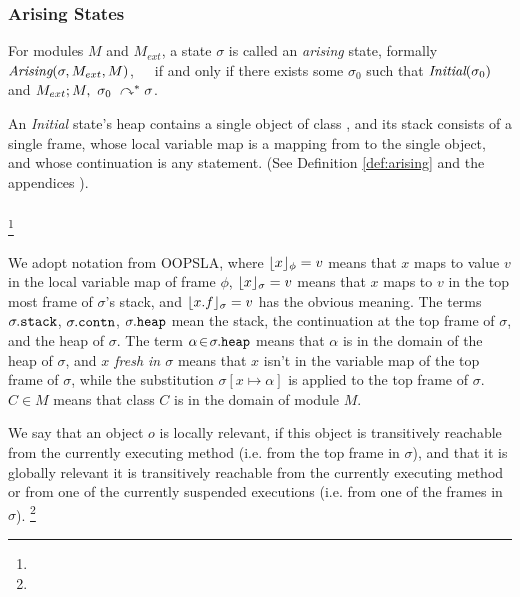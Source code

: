\subsubsection{Arising States}

\begin{definition}
\label{def:arising}
For   modules $M$ and  $M_{ext}$, a %
 state $\sigma$ is 
called an \emph{arising} state, formally \ \ \ $\textit{Arising}(\sigma, M_{ext}, M)$,\ \ \ 
if and only if there exists some $\sigma_0$ such that $\textit{Initial}(\sigma_0)$ and
$M_{ext} ; M,\ \sigma_0\ \curvearrowright^* \sigma$.
\end{definition}

An \emph{Initial} state's heap contains a single object of class , and
its  stack   consists of a single frame, whose local variable map is a
mapping from \prg{this} to the single object, and whose continuation is  any statement.
(See Definition %
\ref{def:arising} and the 
{appendices %
\cite{necessityFull}).}

\subsubsection{}

\footnote{}


We adopt notation from OOPSLA, where
 $\lfloor x \rfloor_{\phi} = v$  means that $x$ maps to
value $v$ in the local variable map of frame $\phi$, $\lfloor x \rfloor_{\sigma} = v$ means that $x$ 
maps to $v$ in the top most frame of $\sigma$'s stack, and $\lfloor x.f \rfloor_{\sigma} = v$
has the obvious meaning. The terms $\sigma.{\texttt{stack}}$,  
$\sigma.{\texttt{contn}}$,  
$\sigma.{\texttt{heap}}$     mean the stack, 
the continuation at the
top frame of $\sigma$, %
and the heap of $\sigma$.
The term $\alpha\!\in\!\sigma.{\texttt{heap}}$ means that $\alpha$ is in the domain of the heap of $\sigma$, and \emph{$x$ fresh in $\sigma$} means that 
$x$ isn't in the variable map of the top frame of $\sigma$, 
while the substitution  $\sigma[x \mapsto \alpha]$ is applied to the top frame of $\sigma$.
 \ $C\in M$ means that class $C$ is in the domain of module $M$. 


We say that an object $o$ is locally relevant, if this object is transitively reachable from the currently executing method (i.e. from the top frame in $\sigma$), and that it is globally relevant it is transitively reachable from the currently executing method or from one of the currently suspended executions (i.e. from one of the frames in $\sigma$). \footnote{}

